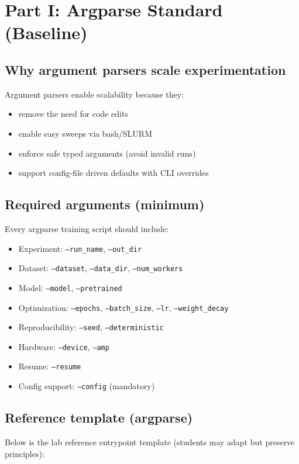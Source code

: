 \documentclass[11pt]{article}
\begin{document}
\section{Part I: Argparse Standard (Baseline)}
\subsection{Why argument parsers scale experimentation}
Argument parsers enable scalability because they:
\begin{itemize}[nosep]
    \item remove the need for code edits
    \item enable easy sweeps via bash/SLURM
    \item enforce safe typed arguments (avoid invalid runs)
    \item support config-file driven defaults with CLI overrides
\end{itemize}

\subsection{Required arguments (minimum)}
Every argparse training script should include:

\begin{itemize}[nosep]
    \item Experiment: \texttt{--run\_name}, \texttt{--out\_dir}
    \item Dataset: \texttt{--dataset}, \texttt{--data\_dir}, \texttt{--num\_workers}
    \item Model: \texttt{--model}, \texttt{--pretrained}
    \item Optimization: \texttt{--epochs}, \texttt{--batch\_size}, \texttt{--lr}, \texttt{--weight\_decay}
    \item Reproducibility: \texttt{--seed}, \texttt{--deterministic}
    \item Hardware: \texttt{--device}, \texttt{--amp}
    \item Resume: \texttt{--resume}
    \item Config support: \texttt{--config} (mandatory)
\end{itemize}

\subsection{Reference template (argparse)}
Below is the lab reference entrypoint template (students may adapt but preserve principles):
\end{document}
